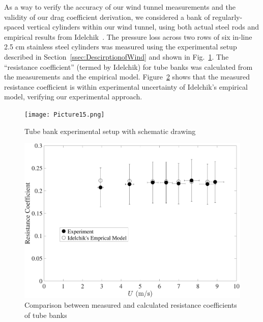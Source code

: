 \documentclass[12pt]{article}
\begin{document}
As a way to verify the accuracy of our wind tunnel measurements and the validity of our drag coefficient derivation, we considered a bank of regularly-spaced vertical cylinders within our wind tunnel, using both actual steel rods and empirical results from Idelchik~\cite{Idelchik1994}. The pressure loss across two rows of six in-line 2.5 cm stainless steel cylinders was measured using the experimental setup described in Section~\ref{ssec:DescirptionofWind} and shown in Fig.~\ref{fig:TBES}. The ``resistance coefficient'' (termed by Idelchik) for tube banks was calculated from the measurements and the empirical model. Figure~\ref{fig:RESCOEF} shows that the measured resistance coefficient is within experimental uncertainty of Idelchik's empirical model, verifying our experimental approach.

\begin{figure}[!h]
	\centering
\texttt{[image: Picture15.png]}
	\caption[Tube bank experimental setup]{Tube bank experimental setup with schematic drawing}
	\label{fig:TBES}
\end{figure}

\begin{figure}[!h]
	\centering
    \includegraphics[width=.8\textwidth,keepaspectratio]{Picture14.pdf}
	\caption[Comparison between resistance coefficients of tube banks ]{Comparison between measured and calculated resistance coefficients of tube banks}
	\label{fig:RESCOEF}
\end{figure}
\end{document}
